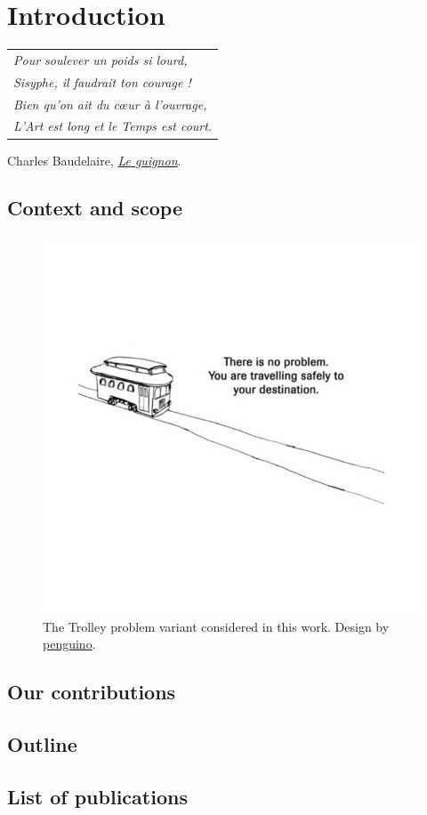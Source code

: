 
\graphicspath{{2-Chapters/1-Chapter/}}

\chapter{Introduction}
\label{chapter:1}

\begin{flushright}
	\begin{tabular}{@{}l@{}}
		\emph{Pour soulever un poids si lourd,}\\
		\emph{Sisyphe, il faudrait ton courage !}\\
		\emph{Bien qu’on ait du cœur à l’ouvrage,}\\
		\emph{L’Art est long et le Temps est court.}\\
	\end{tabular}
	
	Charles Baudelaire, \href{https://eleurent.github.io/sisyphe/texts/le-guignon.html}{\emph{Le guignon}}.
\end{flushright}

\section{Context and scope}

\begin{figure}[tp]
	\centering
	\includegraphics[trim={0 5cm 0 5cm}, clip, width=0.7\linewidth]{img/trolley}
	\caption{The Trolley problem variant considered in this work. Design by \href{https://www.teepublic.com/fr/pin/685858-there-is-no-problem.-you-are-travelling-safely-to-}{penguino}.}
\end{figure}

\section{Our contributions}
\section{Outline}
\section{List of publications}